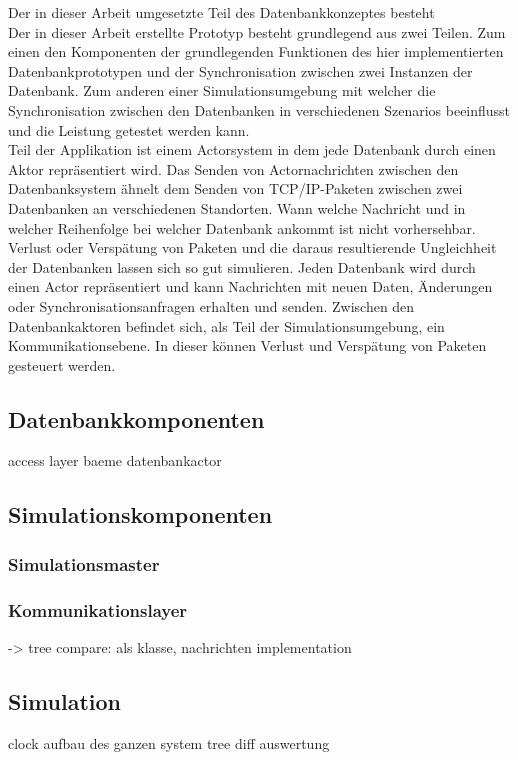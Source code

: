 \documentclass[a4paper,11pt,oneside,%
headsepline,												%
footsepline,												%
bibtotocnumbered									%
]{scrreprt}
\begin{document}
Der in dieser Arbeit umgesetzte Teil des Datenbankkonzeptes besteht\\
Der in dieser Arbeit erstellte Prototyp besteht grundlegend aus zwei Teilen. Zum einen den Komponenten der grundlegenden Funktionen des hier implementierten Datenbankprototypen und der Synchronisation zwischen zwei Instanzen der Datenbank. Zum anderen einer Simulationsumgebung mit welcher die Synchronisation zwischen den Datenbanken in verschiedenen Szenarios beeinflusst und die Leistung getestet werden kann. \\
Teil der Applikation ist einem Actorsystem in dem jede Datenbank durch einen Aktor repräsentiert wird.
Das Senden von Actornachrichten zwischen den Datenbanksystem ähnelt dem Senden von TCP/IP-Paketen zwischen zwei Datenbanken an verschiedenen Standorten. Wann welche Nachricht und in welcher Reihenfolge bei welcher Datenbank ankommt ist nicht vorhersehbar. Verlust oder Verspätung von Paketen und die daraus resultierende Ungleichheit der Datenbanken lassen sich so gut simulieren.
Jeden Datenbank wird durch einen Actor repräsentiert und kann Nachrichten mit neuen Daten, Änderungen oder Synchronisationsanfragen erhalten und senden. Zwischen den Datenbankaktoren befindet sich, als Teil der Simulationsumgebung, ein Kommunikationsebene. In dieser können  Verlust und Verspätung von Paketen gesteuert werden.




\subsection{Datenbankkomponenten}
access layer
baeme
datenbankactor

\subsection{Simulationskomponenten}	
\subsubsection{Simulationsmaster}
\subsubsection{Kommunikationslayer}

-> tree compare: als klasse, nachrichten implementation	
		
\subsection{Simulation}
clock
aufbau des ganzen system
tree diff
auswertung
\end{document}
